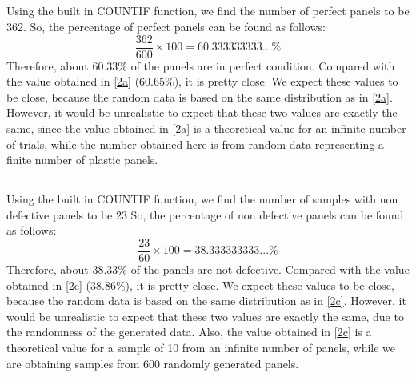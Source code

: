 \documentclass[letterpaper]{article}
\begin{document}
\subsection{}%
Using the built in COUNTIF function, we find the number of perfect panels to be
362. So, the percentage of perfect panels can be found as follows:
$$\frac{362}{600}\times 100 = 60.333333333...\%$$
Therefore, about $60.33\%$ of the panels are in perfect condition. Compared with
the value obtained in \ref{2a} ($60.65\%$), it is pretty close. We expect these
values to be close, because the random data is based on the same distribution as
in \ref{2a}. However, it would be unrealistic to expect that these two values
are exactly the same, since the value obtained in \ref{2a} is a theoretical
value for an infinite number of trials, while the number obtained here is from
random data representing a finite number of plastic panels.


\subsection{}%
Using the built in COUNTIF function, we find the number of samples with non
defective panels to be 23 So, the percentage of non defective panels can be
found as follows:
$$\frac{23}{60}\times 100 = 38.333333333...\%$$
Therefore, about $38.33\%$ of the panels are not defective. Compared with the
value obtained in \ref{2c} ($38.86\%$), it is pretty close. We expect these
values to be close, because the random data is based on the same distribution as
in \ref{2c}. However, it would be unrealistic to expect that these two values
are exactly the same, due to the randomness of the generated data. Also, the
value obtained in \ref{2c} is a theoretical value for a sample of 10 from an
infinite number of panels, while we are obtaining samples from 600 randomly
generated panels.

\subsection{}%
\end{document}
